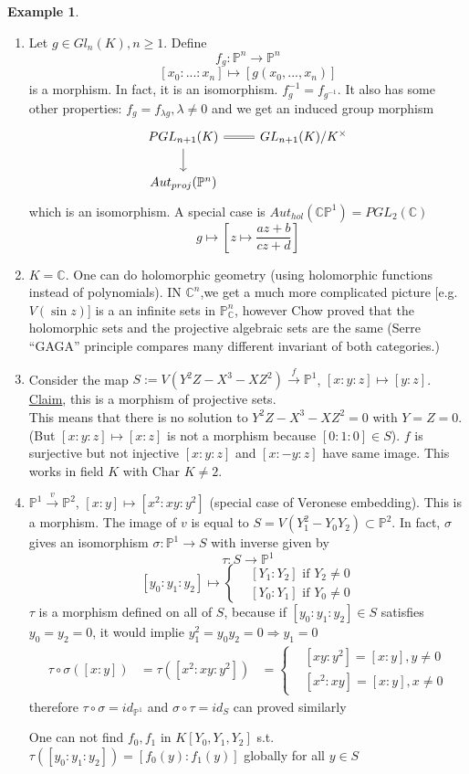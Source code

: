 \documentclass[11pt]{article}
\theoremstyle{definition}
\newtheorem{ex}[thm]{Example}
\newcommand{\proj}{\mathbb P}
\newcommand{\cplx}{\mathbb C}
\newcommand{\Lrta}{\Longrightarrow}
\newcommand{\lrta}{\longrightarrow}
\begin{document}
\begin{ex}\ 
\begin{enumerate}[label=(\arabic*)]
\item Let $g\in Gl_n(K), n\geq 1$. Define 
$$
f_g:\proj^n\lrta \proj^n
$$
$$
[x_0:...:x_n]\longmapsto [g(x_0,...,x_n)]
$$
is a morphism. In fact, it is an isomorphism. $f^{-1}_g=f_{g^{-1}}$.
It also has some other properties: $f_{g}=f_{\lambda g},\lambda\neq 0$ and we get an induced group morphism
\[
\begin{tikzcd}
PGL_{n+1}(K) \arrow[d] \arrow[r, equal] & GL_{n+1}(K)/K^\times \\
Aut_{proj}(\proj^n) & 
\end{tikzcd}
\]
which is an isomorphism. A special case is $Aut_{hol}(\cplx \proj^1)=PGL_2(\cplx)$
$$
g\longmapsto \left[z\mapsto \frac{az+b}{cz+d}\right]
$$
\item  $K=\cplx$. One can do  holomorphic geometry (using holomorphic functions instead of polynomials). IN $\cplx^n$,we get a  much more complicated picture [e.g. $V(\sin z)$] is a an infinite sets in $\proj^n_\cplx$, however Chow proved that the holomorphic sets and the projective algebraic sets are the same (Serre ``GAGA'' principle compares many different invariant of both categories.)
\item Consider the map $S:=V(Y^2Z-X^3-XZ^2)\overset{f}{\lrta} \proj^1$, $[x:y:z]\mapsto [y:z]$. \\
\underline{Claim}, this is a morphism of projective sets.
\\
This means that there is no solution to $Y^2Z-X^3-XZ^2=0$ with $Y=Z=0$. (But $[x:y:z]\mapsto [x:z]$ is not a morphism because $[0:1:0]\in S$). $f$ is surjective but not injective $[x:y:z]$ and $[x:-y:z]$ have same image. This works in field $K$ with $\text{Char } K\neq 2$.
\item $\proj^1\overset{v}{\lrta} \proj^2$, $[x:y]\mapsto [x^2:xy:y^2]$ (special case of Veronese embedding). This is a morphism. The image of $v$ is equal to  $S=V(Y_1^2-Y_0Y_2)\subset \proj^2$.  In fact, $\sigma$ gives an isomorphism
$\sigma: \proj^1\lrta S$ with inverse given by 
$$
\tau: S\lrta \proj^1
$$
$$
[y_0:y_1:y_2]\mapsto\left\{\begin{matrix*}
&[Y_1:Y_2] \text{ if } Y_2\neq 0\\
&[Y_0:Y_1]\text{ if } Y_0\neq 0
\end{matrix*}
\right.
$$
$\tau$ is a morphism defined on all of $S$, because if $[y_0:y_1:y_2]\in S$ satisfies $y_0=y_2=0$, it would implie $y^2_1=y_0y_2=0\Lrta y_1=0$ 
$$
\begin{aligned}
\tau\circ \sigma([x:y])&=\tau([x^2:xy:y^2])
&=\left\{\begin{matrix*}
&[xy:y^2]=[x:y], y\neq 0
\\
&[x^2:xy]=[x:y], x\neq 0
\end{matrix*}\right.
\end{aligned}
$$
therefore $\tau\circ \sigma= id_{\proj^1}$ and $\sigma\circ \tau=id_S$ can proved similarly

One can not find $f_0,f_1$ in $K[Y_0,Y_1,Y_2]$ s.t. $\tau([y_0:y_1:y_2])=[f_0(y):f_1(y)]$  globally for all $y\in S$
\end{enumerate}
\end{ex}
\end{document}
